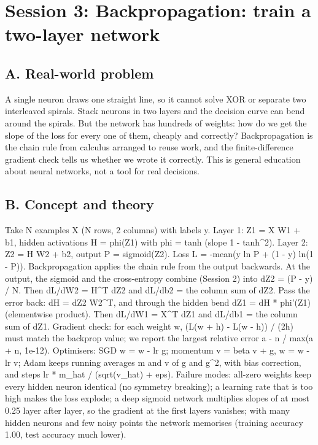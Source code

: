 \documentclass[11pt,a4paper]{article}
\begin{document}
\section{Session 3: Backpropagation: train a two-layer network}

\subsection*{A. Real-world problem}
A single neuron draws one straight line, so it cannot solve XOR or separate two interleaved spirals. Stack neurons in two layers and the decision curve can bend around the spirals. But the network has hundreds of weights: how do we get the slope of the loss for every one of them, cheaply and correctly? Backpropagation is the chain rule from calculus arranged to reuse work, and the finite-difference gradient check tells us whether we wrote it correctly. This is general education about neural networks, not a tool for real decisions.

\subsection*{B. Concept and theory}
Take N examples X (N rows, 2 columns) with labels y. Layer 1: Z1 = X W1 + b1, hidden activations H = phi(Z1) with phi = tanh (slope 1 - tanh\textasciicircum{}2). Layer 2: Z2 = H W2 + b2, output P = sigmoid(Z2). Loss L = -mean(y ln P + (1 - y) ln(1 - P)). Backpropagation applies the chain rule from the output backwards. At the output, the sigmoid and the cross-entropy combine (Session 2) into dZ2 = (P - y) / N. Then dL/dW2 = H\textasciicircum{}T dZ2 and dL/db2 = the column sum of dZ2. Pass the error back: dH = dZ2 W2\textasciicircum{}T, and through the hidden bend dZ1 = dH * phi'(Z1) (elementwise product). Then dL/dW1 = X\textasciicircum{}T dZ1 and dL/db1 = the column sum of dZ1. Gradient check: for each weight w, (L(w + h) - L(w - h)) / (2h) must match the backprop value; we report the largest relative error \textbar{}a - n\textbar{} / max(\textbar{}a\textbar{} + \textbar{}n\textbar{}, 1e-12). Optimisers: SGD w = w - lr g; momentum v = beta v + g, w = w - lr v; Adam keeps running averages m and v of g and g\textasciicircum{}2, with bias correction, and steps lr * m\_hat / (sqrt(v\_hat) + eps). Failure modes: all-zero weights keep every hidden neuron identical (no symmetry breaking); a learning rate that is too high makes the loss explode; a deep sigmoid network multiplies slopes of at most 0.25 layer after layer, so the gradient at the first layers vanishes; with many hidden neurons and few noisy points the network memorises (training accuracy 1.00, test accuracy much lower).
\end{document}
